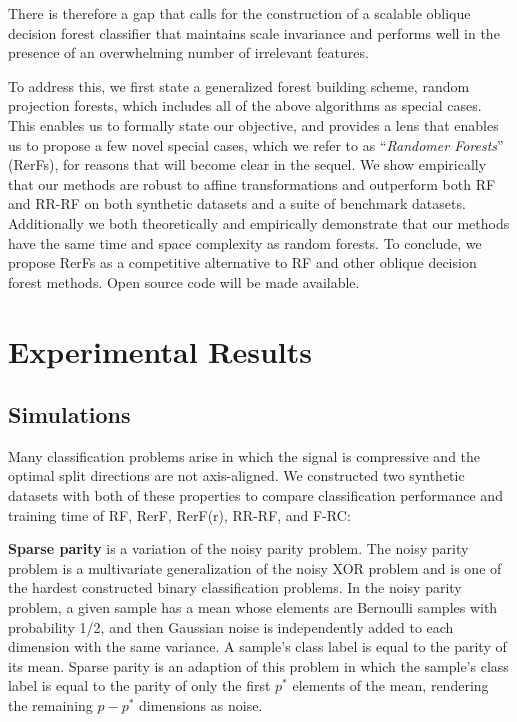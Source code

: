 There is therefore a gap that calls for the construction of a scalable oblique decision forest classifier that maintains scale invariance and performs well in the presence of an overwhelming number of irrelevant features. 

To address this, we first state a generalized forest building scheme, random projection forests, which includes all of the above algorithms as special cases. This enables us to formally state our objective, and provides a lens that enables us to propose a few novel special cases, which we refer to as ``{\em{Randomer Forests}}'' (RerFs), for reasons that will become clear in the sequel. We show empirically that our methods are robust to affine transformations and outperform both RF and RR-RF on both synthetic datasets and a suite of benchmark datasets. Additionally we both theoretically and empirically demonstrate that our methods have the same time and space complexity as random forests. To conclude, we propose RerFs as a competitive alternative to RF and other oblique decision forest methods. Open source code will be made available.

\section{Experimental Results}

\subsection{Simulations}
\label{section: sims}

Many classification problems arise in which the signal is compressive and the optimal split directions are not axis-aligned. We constructed two synthetic datasets with both of these properties to compare classification performance and training time of RF, RerF, RerF(r), RR-RF, and F-RC:

\textbf{Sparse parity} is a variation of the noisy parity problem. The noisy parity problem is a multivariate generalization of the noisy XOR problem and is one of the hardest constructed binary classification problems. In the noisy parity problem, a given sample has a mean whose elements are Bernoulli samples with probability 1/2, and then Gaussian noise is independently added to each dimension with the same variance.  A sample's class label is equal to the parity of its mean. Sparse parity is an adaption of this problem in which the sample's class label is equal to the parity of only the first $p^*$ elements of the mean, rendering the remaining $p - p^*$ dimensions as noise.

